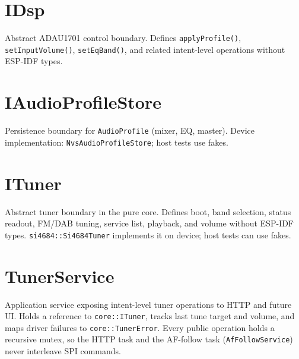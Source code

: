 \section{IDsp}\label{cls:IDsp}
Abstract ADAU1701 control boundary. Defines \texttt{applyProfile()},
\texttt{setInputVolume()}, \texttt{setEqBand()}, and related intent-level
operations without ESP-IDF types.

\section{IAudioProfileStore}\label{cls:IAudioProfileStore}
Persistence boundary for \texttt{AudioProfile} (mixer, EQ, master). Device
implementation: \texttt{NvsAudioProfileStore}; host tests use fakes.


\section{ITuner}\label{cls:ITuner}
Abstract tuner boundary in the pure core. Defines boot, band selection,
status readout, FM/DAB tuning, service list, playback, and volume without
ESP-IDF types. \texttt{si4684::Si4684Tuner} implements it on device; host
tests can use fakes.

\section{TunerService}\label{cls:TunerService}
Application service exposing intent-level tuner operations to HTTP and
future UI. Holds a reference to \texttt{core::ITuner}, tracks last tune
target and volume, and maps driver failures to \texttt{core::TunerError}.
Every public operation holds a recursive mutex, so the HTTP task and the
AF-follow task (\texttt{AfFollowService}) never interleave SPI commands.

